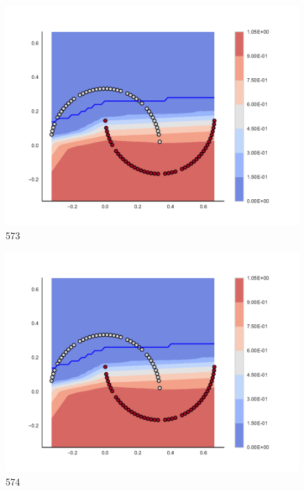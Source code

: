\begin{subfigure}[b]{0.09\textwidth}
    \includegraphics[clip, trim=2.35cm 1.75cm 4.5cm 0cm,width=\textwidth]{img/convergence/573.pdf}
    \caption{573}
    \label{fig:convergence_573}
\end{subfigure}
%
\begin{subfigure}[b]{0.09\textwidth}
    \includegraphics[clip, trim=2.35cm 1.75cm 4.5cm 0cm,width=\textwidth]{img/convergence/574.pdf}
    \caption{574}
    \label{fig:convergence_574}
\end{subfigure}
%
